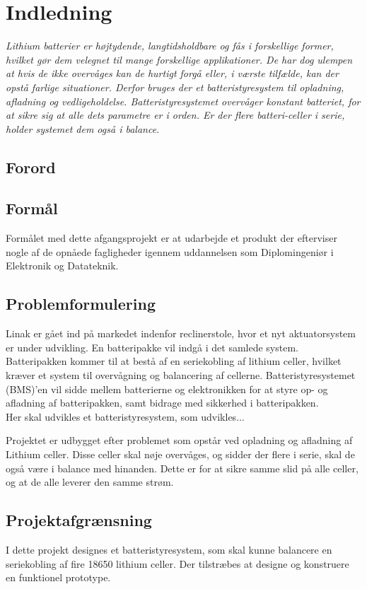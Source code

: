 \chapter{Indledning}

\emph{Lithium batterier er højtydende, langtidsholdbare og fås i forskellige former, hvilket gør dem velegnet til mange forskellige applikationer. De har dog ulempen at hvis de ikke overvåges kan de hurtigt forgå eller, i værste tilfælde, kan der opstå farlige situationer. Derfor bruges der et batteristyresystem til opladning, afladning og vedligeholdelse. Batteristyresystemet overvåger konstant batteriet, for at sikre sig at alle dets parametre er i orden. Er der flere batteri-celler i serie, holder systemet dem også i balance. }

\section{Forord}\label{sec:forord}

\section{Formål}
Formålet med dette afgangsprojekt er at udarbejde et produkt der efterviser nogle af de opnåede fagligheder igennem uddannelsen som Diplomingeniør i Elektronik og Datateknik.

\section{Problemformulering}
Linak er gået ind på markedet indenfor reclinerstole, hvor et nyt aktuatorsystem er under udvikling. En batteripakke vil indgå i det samlede system. Batteripakken kommer til at bestå af en seriekobling af lithium celler, hvilket kræver et system til overvågning og balancering af cellerne. Batteristyresystemet (BMS)’en vil sidde mellem batterierne og elektronikken for at styre op- og afladning af batteripakken, samt bidrage med sikkerhed i batteripakken. \\

Her skal udvikles et batteristyresystem, som udvikles...


Projektet er udbygget efter problemet som opstår ved opladning og afladning af Lithium celler. Disse celler skal nøje overvåges, og sidder der flere i serie, skal de også være i balance med hinanden. Dette er for at sikre samme slid på alle celler, og at de alle leverer den samme strøm. 

\section{Projektafgrænsning}
I dette projekt designes et batteristyresystem, som skal kunne balancere en seriekobling af fire 18650 lithium celler. Der tilstræbes at designe og konstruere en funktionel prototype.
